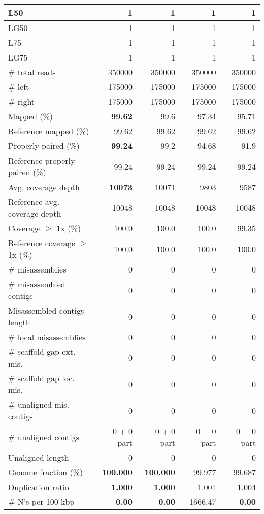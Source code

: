 \documentclass[12pt,a4paper]{article}
\begin{document}
\begin{table}[ht]
\begin{center}
\begin{tabular}{|l*{4}{|r}|}
L50 & 1 & 1 & 1 & 1 \\ \hline
LG50 & 1 & 1 & 1 & 1 \\ \hline
L75 & 1 & 1 & 1 & 1 \\ \hline
LG75 & 1 & 1 & 1 & 1 \\ \hline
\# total reads & 350000 & 350000 & 350000 & 350000 \\ \hline
\# left & 175000 & 175000 & 175000 & 175000 \\ \hline
\# right & 175000 & 175000 & 175000 & 175000 \\ \hline
Mapped (\%) & {\bf 99.62} & 99.6 & 97.34 & 95.71 \\ \hline
Reference mapped (\%) & 99.62 & 99.62 & 99.62 & 99.62 \\ \hline
Properly paired (\%) & {\bf 99.24} & 99.2 & 94.68 & 91.9 \\ \hline
Reference properly paired (\%) & 99.24 & 99.24 & 99.24 & 99.24 \\ \hline
Avg. coverage depth & {\bf 10073} & 10071 & 9803 & 9587 \\ \hline
Reference avg. coverage depth & 10048 & 10048 & 10048 & 10048 \\ \hline
Coverage $\geq$ 1x (\%) & 100.0 & 100.0 & 100.0 & 99.35 \\ \hline
Reference coverage $\geq$ 1x (\%) & 100.0 & 100.0 & 100.0 & 100.0 \\ \hline
\# misassemblies & 0 & 0 & 0 & 0 \\ \hline
\# misassembled contigs & 0 & 0 & 0 & 0 \\ \hline
Misassembled contigs length & 0 & 0 & 0 & 0 \\ \hline
\# local misassemblies & 0 & 0 & 0 & 0 \\ \hline
\# scaffold gap ext. mis. & 0 & 0 & 0 & 0 \\ \hline
\# scaffold gap loc. mis. & 0 & 0 & 0 & 0 \\ \hline
\# unaligned mis. contigs & 0 & 0 & 0 & 0 \\ \hline
\# unaligned contigs & 0 + 0 part & 0 + 0 part & 0 + 0 part & 0 + 0 part \\ \hline
Unaligned length & 0 & 0 & 0 & 0 \\ \hline
Genome fraction (\%) & {\bf 100.000} & {\bf 100.000} & 99.977 & 99.687 \\ \hline
Duplication ratio & {\bf 1.000} & {\bf 1.000} & 1.001 & 1.004 \\ \hline
\# N's per 100 kbp & {\bf 0.00} & {\bf 0.00} & 1666.47 & {\bf 0.00} \\ \hline

\end{tabular}
\end{center}
\end{table}
\end{document}
